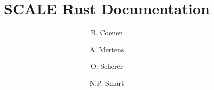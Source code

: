 \documentclass{article}
\begin{document}
\newcommand{\mainsection}[1]{\newpage \section{#1}}
\newcommand{\msubsection}[1]{\newpage \subsection{#1}}
\newcommand{\msubsubsection}[1]{\subsubsection{#1}}

\title{SCALE Rust Documentation}
\author{
B. Coenen
\and A. Mertens
\and O. Scherer
\and N.P. Smart}

\maketitle

\tableofcontents



















\end{document}
